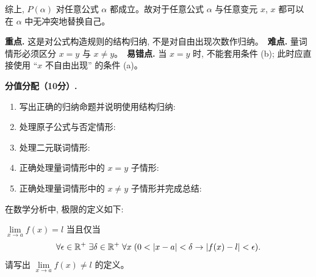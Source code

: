 \documentclass[a4paper, justified]{tufte-handout}
\begin{document}
\begin{solution}
  综上, $P(\alpha)$ 对任意公式 $\alpha$ 都成立。故对于任意公式 $\alpha$ 与任意变元 $x$,
  $x$ 都可以在 $\alpha$ 中无冲突地替换自己。

  \begin{remark}
    \textbf{重点.} 这是对公式构造规则的结构归纳, 不是对自由出现次数作归纳。\
    \textbf{难点.} 量词情形必须区分 $x = y$ 与 $x \neq y$。\
    \textbf{易错点.} 当 $x = y$ 时, 不能套用条件 (b); 此时应直接使用 ``$x$ 不自由出现'' 的条件 (a)。
  \end{remark}

  \textbf{分值分配（10分）.}
  \begin{enumerate}[(1)]
    \item 写出正确的归纳命题并说明使用结构归纳: 
    \item 处理原子公式与否定情形: 
    \item 处理二元联词情形: 
    \item 正确处理量词情形中的 $x = y$ 子情形: 
    \item 正确处理量词情形中的 $x \neq y$ 子情形并完成总结: \score{2}
  \end{enumerate}
\end{solution}

\newpage
\begin{problem}
  在数学分析中, 极限的定义如下:

  $\lim\limits_{x \to a} f(x) = l$ 当且仅当
  \[
    \forall \epsilon \in \mathbb{R}^{+}\; \exists \delta \in \mathbb{R}^{+}\;
      \forall x\; (0 < |x - a| < \delta \to |f(x) - l| < \epsilon).
  \]
  请写出 $\lim\limits_{x \to a} f(x) \neq l$ 的定义。
\end{problem}
\end{document}
